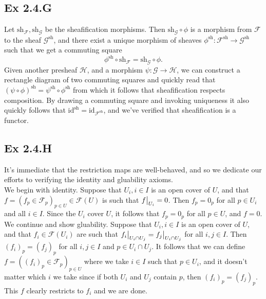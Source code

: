 \documentclass{article}
\newcommand\restr[2]{{%
  \left.\kern-\nulldelimiterspace %
  #1 %
  \vphantom{\big|} %
  \right|_{#2} %
  }}
\theoremstyle{definition}
\newcommand{\id}{\text{id}}
\begin{document}
\subsection*{Ex 2.4.G}

Let $\text{sh}_\mathcal{F}, \text{sh}_{\mathcal{G}}$ be the sheafification
morphisms. Then $\text{sh}_{\mathcal{G}} \circ \phi$ is a morphism from
$\mathcal{F}$ to the sheaf $\mathcal{G}^{\text{sh}}$, and there exist a unique
morphism of sheaves $\phi^{\text{sh}} : \mathcal{F}^{\text{sh}} \to
	\mathcal{G}^{\text{sh}}$ such that we get a commuting square
\[
	\phi^{\text{sh}} \circ \text{sh}_{\mathcal{F}}
	=
	\text{sh}_{\mathcal{G}} \circ \phi.
\]
Given another presheaf $\mathcal{H}$, and a morphism $\psi : \mathcal{G} \to
	\mathcal{H}$, we can construct a rectangle diagram of two commuting squares and
quickly read that $(\psi \circ \phi)^{\text{sh}} = \psi^{\text{sh}} \circ
	\phi^{\text{sh}}$ from which it follows that sheafification respects
composition. By drawing a commuting square and invoking uniqueness it also
quickly follows that $\id^{\text{sh}} = \id_{\mathcal{F}^{\text{sh}}}$, and
we've verified that sheafification is a functor.

\subsection*{Ex 2.4.H}

It's immediate that the restriction maps are well-behaved, and so we dedicate
our efforts to verifying the identity and gluability axioms. \\

We begin with identity. Suppose that $U_i, i \in I$ is an open cover of $U$,
and that $f = (f_p \in \mathcal{F}_p)_{p \in U} \in \mathcal{F}(U)$ is such
that $\restr{f}{U_i} = 0$. Then $f_p = 0_p$ for all $p \in U_i$ and all $i \in
	I$. Since the $U_i$ cover $U$, it follows that $f_p = 0_p$ for all $p \in U$,
and $f = 0$. \\

We continue and show gluability. Suppose that $U_i, i \in I$ is an open cover
of $U$, and that $f_i \in \mathcal{F}(U_i)$ are such that $\restr{f_i}{U_i \cap
		U_j} = \restr{f_j}{U_i \cap U_j}$ for all $i, j \in I$. Then $(f_i)_p =
	(f_j)_p$ for all $i, j \in I$ and $p \in U_i \cap U_j$. It follows that we can
define $f = ((f_i)_p \in \mathcal{F}_p)_{p \in U}$ where we take $i \in I$ such
that $p \in U_i$, and it doesn't matter which $i$ we take since if both $U_i$
and $U_j$ contain $p$, then $(f_i)_p = (f_j)_p$. This $f$ clearly restricts to
$f_i$ and we are done.
\end{document}
